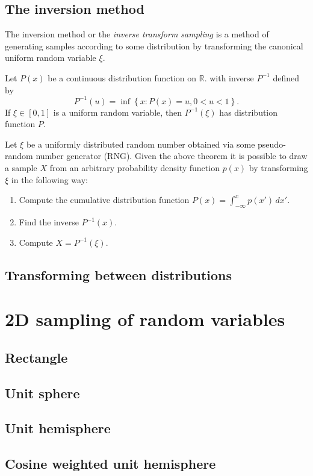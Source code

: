 \subsection{The inversion method}
The inversion method or the \emph{inverse transform sampling} \parencite{devroye86} is a method of generating samples according to some distribution by transforming the canonical uniform random variable $\xi$.
\begin{thm}
  Let $P(x)$ be a continuous distribution function on $\mathbb{R}$. with inverse $P^{-1}$ defined by
  \begin{equation}
    P^{-1}(u) = \inf \left\{ x:P(x)=u, 0 < u < 1 \right\}.
  \end{equation}
If $\xi \in [0,1]$ is a uniform random variable, then $P^{-1}(\xi)$ has distribution function $P$.
\end{thm}

Let $\xi$ be a uniformly distributed random number obtained via some pseudo-random number generator (RNG). Given the above theorem it is possible to draw a sample $X$ from an arbitrary probability density function $p(x)$ by transforming $\xi$ in the following way:
\begin{enumerate}
\item Compute the cumulative distribution function $P(x) = \int_{-\infty}^{x} p(x') \,dx'$.
\item Find the inverse $P^{-1}(x)$.
\item Compute $X = P^{-1}(\xi)$.
\end{enumerate}

\subsection{Transforming between distributions}

\section{2D sampling of random variables}

\subsection{Rectangle}

\subsection{Unit sphere}

\subsection{Unit hemisphere}

\subsection{Cosine weighted unit hemisphere}

